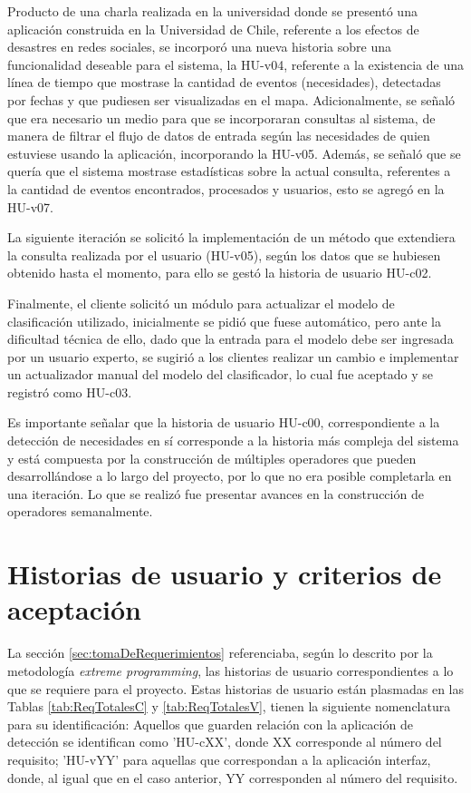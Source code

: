 Producto de una charla realizada en la universidad donde se presentó una aplicación construida en la Universidad de Chile, referente a los efectos de desastres en redes sociales, se incorporó una nueva historia sobre una funcionalidad deseable para el sistema, la HU-v04, referente a la existencia de una línea de tiempo que mostrase la cantidad de eventos (necesidades), detectadas por fechas y que pudiesen ser visualizadas en el mapa. Adicionalmente, se señaló que era necesario un medio para que se incorporaran consultas al sistema, de manera de filtrar el flujo de datos de entrada según las necesidades de quien estuviese usando la aplicación, incorporando la HU-v05. Además, se señaló que se quería que el sistema mostrase estadísticas sobre la actual consulta, referentes a la cantidad de eventos encontrados, procesados y usuarios, esto se agregó en la HU-v07.

La siguiente iteración se solicitó la implementación de un método que extendiera la consulta realizada por el usuario (HU-v05), según los datos que se hubiesen obtenido hasta el momento, para ello se gestó la historia de usuario HU-c02.

Finalmente, el cliente solicitó un módulo para actualizar el modelo de clasificación utilizado, inicialmente se pidió que fuese automático, pero ante la dificultad técnica de ello, dado que la entrada para el modelo debe ser ingresada por un usuario experto, se sugirió a los clientes realizar un cambio e implementar un actualizador manual del modelo del clasificador, lo cual fue aceptado y se registró como HU-c03.

Es importante señalar que la historia de usuario HU-c00, correspondiente a la detección de necesidades en sí corresponde a la historia más compleja del sistema y está compuesta por la construcción de múltiples operadores que pueden desarrollándose a lo largo del proyecto, por lo que no era posible completarla en una iteración. Lo que se realizó fue presentar avances en la construcción de operadores semanalmente.

\section{Historias de usuario y criterios de aceptación}
\label{sec:historias}

La sección \ref{sec:tomaDeRequerimientos} referenciaba, según lo descrito por la metodología \textit{extreme programming}, las historias de usuario correspondientes a lo que se requiere para el proyecto. Estas historias de usuario están plasmadas en las Tablas \ref{tab:ReqTotalesC} y \ref{tab:ReqTotalesV}, tienen la siguiente nomenclatura para su identificación: Aquellos que guarden relación con la aplicación de detección se identifican como 'HU-cXX', donde XX corresponde al número del requisito; 'HU-vYY' para aquellas que correspondan a la aplicación interfaz, donde, al igual que en el caso anterior, YY corresponden al número del requisito.

